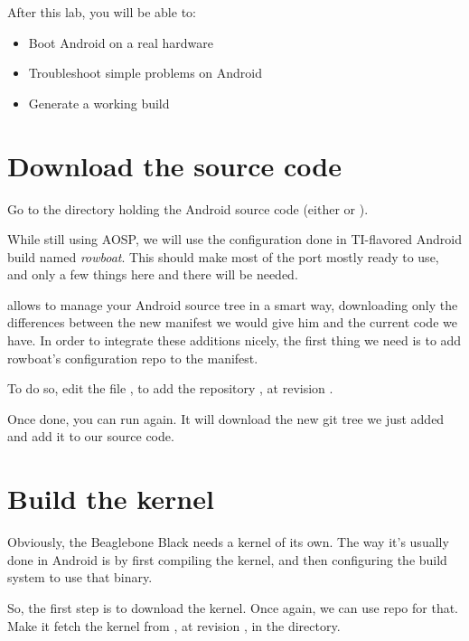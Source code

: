 
After this lab, you will be able to:
\begin{itemize}
  \item Boot Android on a real hardware
  \item Troubleshoot simple problems on Android
  \item Generate a working build
\end{itemize}

\section{Download the source code}

Go to the directory holding the Android source code (either
 or ).

While still using AOSP, we will use the configuration done in
TI-flavored Android build named \emph{rowboat}. This should make most
of the port mostly ready to use, and only a few things here and there
will be needed.

 allows to manage your Android source tree in a smart way,
downloading only the differences between the new manifest we would
give him and the current code we have. In order to integrate these
additions nicely, the first thing we need is to add rowboat's
configuration repo to the manifest.

To do so, edit the file , to add the
repository
, at
revision .

Once done, you can run  again. It will download the
new git tree we just added and add it to our source code.

\section{Build the kernel}

Obviously, the Beaglebone Black needs a kernel of its own. The way
it's usually done in Android is by first compiling the kernel, and
then configuring the build system to use that binary.

So, the first step is to download the kernel. Once again, we can use
repo for that. Make it fetch the kernel from
, at revision
, in the  directory.

